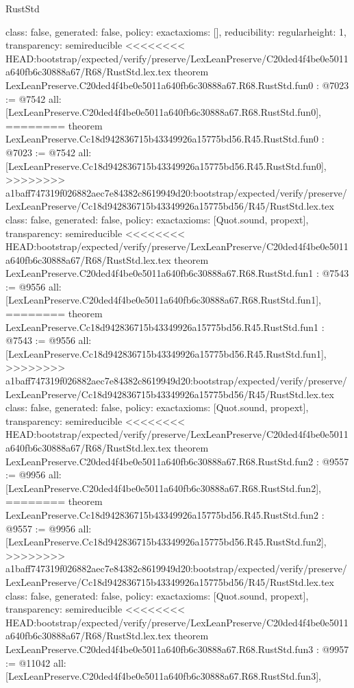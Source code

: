 \begin{lexlean}{RustStd}
\begin{coremodule}
{\begin{coremodule}
{{{  class: false,
  generated: false,
  policy: exact{axioms: []},
  reducibility: regular{height: 1},
  transparency: semireducible
}
<<<<<<<< HEAD:bootstrap/expected/verify/preserve/LexLeanPreserve/C20ded4f4be0e5011a640fb6c30888a67/R68/RustStd.lex.tex
theorem LexLeanPreserve.C20ded4f4be0e5011a640fb6c30888a67.R68.RustStd.fun0 : @7023 := @7542 {
  all: [LexLeanPreserve.C20ded4f4be0e5011a640fb6c30888a67.R68.RustStd.fun0],
========
theorem LexLeanPreserve.Cc18d942836715b43349926a15775bd56.R45.RustStd.fun0 : @7023 := @7542 {
  all: [LexLeanPreserve.Cc18d942836715b43349926a15775bd56.R45.RustStd.fun0],
>>>>>>>> a1baff747319f026882aec7e84382c8619949d20:bootstrap/expected/verify/preserve/LexLeanPreserve/Cc18d942836715b43349926a15775bd56/R45/RustStd.lex.tex
  class: false,
  generated: false,
  policy: exact{axioms: [Quot.sound, propext]},
  transparency: semireducible
}
<<<<<<<< HEAD:bootstrap/expected/verify/preserve/LexLeanPreserve/C20ded4f4be0e5011a640fb6c30888a67/R68/RustStd.lex.tex
theorem LexLeanPreserve.C20ded4f4be0e5011a640fb6c30888a67.R68.RustStd.fun1 : @7543 := @9556 {
  all: [LexLeanPreserve.C20ded4f4be0e5011a640fb6c30888a67.R68.RustStd.fun1],
========
theorem LexLeanPreserve.Cc18d942836715b43349926a15775bd56.R45.RustStd.fun1 : @7543 := @9556 {
  all: [LexLeanPreserve.Cc18d942836715b43349926a15775bd56.R45.RustStd.fun1],
>>>>>>>> a1baff747319f026882aec7e84382c8619949d20:bootstrap/expected/verify/preserve/LexLeanPreserve/Cc18d942836715b43349926a15775bd56/R45/RustStd.lex.tex
  class: false,
  generated: false,
  policy: exact{axioms: [Quot.sound, propext]},
  transparency: semireducible
}
<<<<<<<< HEAD:bootstrap/expected/verify/preserve/LexLeanPreserve/C20ded4f4be0e5011a640fb6c30888a67/R68/RustStd.lex.tex
theorem LexLeanPreserve.C20ded4f4be0e5011a640fb6c30888a67.R68.RustStd.fun2 : @9557 := @9956 {
  all: [LexLeanPreserve.C20ded4f4be0e5011a640fb6c30888a67.R68.RustStd.fun2],
========
theorem LexLeanPreserve.Cc18d942836715b43349926a15775bd56.R45.RustStd.fun2 : @9557 := @9956 {
  all: [LexLeanPreserve.Cc18d942836715b43349926a15775bd56.R45.RustStd.fun2],
>>>>>>>> a1baff747319f026882aec7e84382c8619949d20:bootstrap/expected/verify/preserve/LexLeanPreserve/Cc18d942836715b43349926a15775bd56/R45/RustStd.lex.tex
  class: false,
  generated: false,
  policy: exact{axioms: [Quot.sound, propext]},
  transparency: semireducible
}
<<<<<<<< HEAD:bootstrap/expected/verify/preserve/LexLeanPreserve/C20ded4f4be0e5011a640fb6c30888a67/R68/RustStd.lex.tex
theorem LexLeanPreserve.C20ded4f4be0e5011a640fb6c30888a67.R68.RustStd.fun3 : @9957 := @11042 {
  all: [LexLeanPreserve.C20ded4f4be0e5011a640fb6c30888a67.R68.RustStd.fun3],
}}}}}}
\end{coremodule}}
\end{coremodule}
\end{lexlean}
